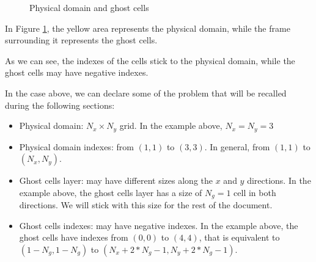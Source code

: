 \begin{figure}[H]
    \centering
    \def\nCV{5}
    \def\dX{1.5cm}
    \def\dY{1.5cm}

    \caption{Physical domain and ghost cells}
    \label{fig:ghost_cells}
\end{figure}

In Figure \ref{fig:ghost_cells}, the yellow area represents the physical domain, while the frame surrounding it represents the ghost cells.

As we can see, the indexes of the cells stick to the physical domain, while the ghost cells may have negative indexes.

In the case above, we can declare some of the problem that will be recalled during the following sections:

\begin{itemize}
    \item Physical domain: $N_x \times N_y$ grid. In the example above, $N_x = N_y = 3$
    \item Physical domain indexes: from $(1,1)$ to $(3,3)$. In general, from $(1,1)$ to $(N_x,N_y)$.
    \item Ghost cells layer: may have different sizes along the $x$ and $y$ directions. In the example above, the ghost cells layer has a size of $N_g = 1$ cell in both directions. We will stick with this size for the rest of the document.
    \item Ghost cells indexes: may have negative indexes. In the example above, the ghost cells have indexes from $(0,0)$ to $(4,4)$, that is equivalent to $(1-N_g,1-N_g)$ to $(N_x+2*N_g-1,N_y+2*N_g-1)$.
\end{itemize}

